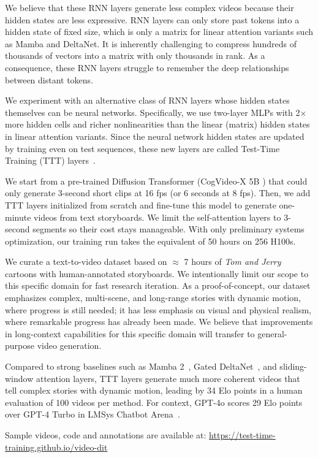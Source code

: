 We believe that these RNN layers generate less complex videos because their hidden states are less expressive.
RNN layers can only store past tokens into a hidden state of fixed size, which is only a matrix for linear attention variants such as Mamba and DeltaNet.
It is inherently challenging to compress hundreds of thousands of vectors into a matrix with only thousands in rank.
As a consequence, these RNN layers struggle to remember the deep relationships between distant tokens.

We experiment with an alternative class of RNN layers whose hidden states themselves can be neural networks. Specifically, we use two-layer MLPs with 2$\times$ more hidden cells and richer nonlinearities than the linear (matrix) hidden states in linear attention variants.
Since the neural network hidden states are updated by training even on test sequences, these new layers are called Test-Time Training (TTT) layers~\cite{sun2024ttt}.

We start from a pre-trained Diffusion Transformer (CogVideo-X 5B \cite{hong2023cogvideo}) that could only generate 3-second short clips at 16 fps (or 6 seconds at 8 fps).
Then, we add TTT layers initialized from scratch and fine-tune this model to generate one-minute videos from text storyboards. 
We limit the self-attention layers to 3-second segments so their cost stays manageable.
With only preliminary systems optimization, our training run takes the equivalent of 50 hours on 256 H100s.

We curate a text-to-video dataset based on $\approx$ 7 hours of \textit{Tom and Jerry} cartoons with human-annotated storyboards.
We intentionally limit our scope to this specific domain for fast research iteration.
As a proof-of-concept, our dataset emphasizes complex, multi-scene, and long-range stories with dynamic motion, where progress is still needed; it has less emphasis on visual and physical realism, where remarkable progress has already been made.
We believe that improvements in long-context capabilities for this specific domain will transfer to general-purpose video generation.

Compared to strong baselines such as Mamba 2~\cite{dao2024mamba2}, Gated DeltaNet~\cite{yang2025gateddeltanetworksimproving}, and sliding-window attention layers, TTT layers generate much more coherent videos that tell complex stories with dynamic motion, leading by 34 Elo points in a human evaluation of 100 videos per method.
For context, GPT-4o scores 29 Elo points over GPT-4 Turbo in LMSys Chatbot Arena~\cite{chiang2024chatbot}.

Sample videos, code and annotations are available at:
\url{https://test-time-training.github.io/video-dit}
